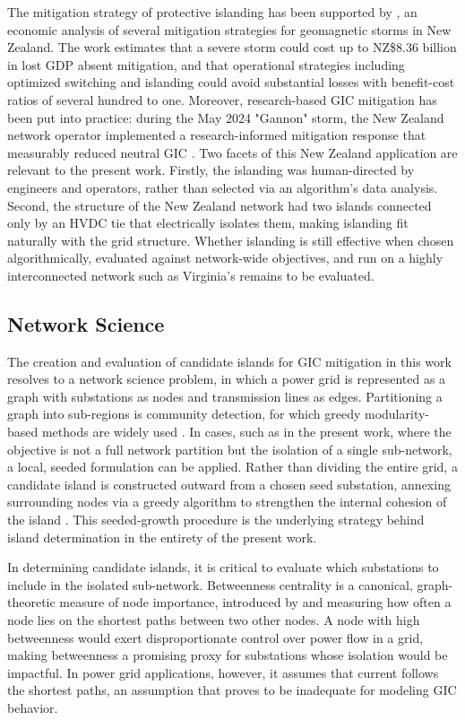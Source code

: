 \documentclass[draft]{agujournal2019}
\begin{document}
The mitigation strategy of protective islanding has been supported by , an economic analysis of several mitigation strategies for geomagnetic storms in New Zealand. The work estimates that a severe storm could cost up to NZ\$8.36 billion in lost GDP absent mitigation, and that operational strategies including optimized switching and islanding could avoid substantial losses with benefit-cost ratios of several hundred to one. Moreover, research-based GIC mitigation has been put into practice: during the May 2024 "Gannon" storm, the New Zealand network operator implemented a research-informed mitigation response that measurably reduced neutral GIC \cite{MacManus2025}.
Two facets of this New Zealand application are relevant to the present work. Firstly, the islanding was human-directed by engineers and operators, rather than selected via an algorithm's data analysis. Second, the structure of the New Zealand network had two islands connected only by an HVDC tie that electrically isolates them, making islanding fit naturally with the grid structure. Whether islanding is still effective when chosen algorithmically, evaluated against network-wide objectives, and run on a highly interconnected network such as Virginia's remains to be evaluated.

\subsection{Network Science}

The creation and evaluation of candidate islands for GIC mitigation in this work resolves to a network science problem, in which a power grid is represented as a graph with substations as nodes and transmission lines as edges. Partitioning a graph into sub-regions is community detection, for which greedy modularity-based methods are widely used \cite{Clauset2004}. In cases, such as in the present work, where the objective is not a full network partition but the isolation of a single sub-network, a local, seeded formulation can be applied. Rather than dividing the entire grid, a candidate island is constructed outward from a chosen seed substation, annexing surrounding nodes via a greedy algorithm to strengthen the internal cohesion of the island \cite{clauset2005}. This seeded-growth procedure is the underlying strategy behind island determination in the entirety of the present work.

In determining candidate islands, it is critical to evaluate which substations to include in the isolated sub-network. Betweenness centrality is a canonical, graph-theoretic measure of node importance, introduced by  and measuring how often a node lies on the shortest paths between two other nodes. A node with high betweenness would exert disproportionate control over power flow in a grid, making betweenness a promising proxy for substations whose isolation would be impactful. In power grid applications, however, it assumes that current follows the shortest paths, an assumption that proves to be inadequate for modeling GIC behavior. 
\end{document}
